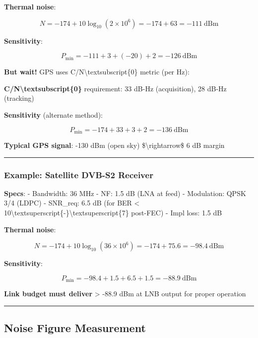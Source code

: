 \textbf{Thermal noise}:

\[
N = -174 + 10\log_{10}(2 \times 10^6) = -174 + 63 = -111\ \text{dBm}
\]

\textbf{Sensitivity}:

\[
P_{\text{min}} = -111 + 3 + (-20) + 2 = -126\ \text{dBm}
\]

\textbf{But wait!} GPS uses C/N\textbackslash textsubscript\{0\} metric
(per Hz):

\textbf{C/N\textbackslash textsubscript\{0\}} requirement: 33 dB-Hz
(acquisition), 28 dB-Hz (tracking)

\textbf{Sensitivity} (alternate method):

\[
P_{\text{min}} = -174 + 33 + 3 + 2 = -136\ \text{dBm}
\]

\textbf{Typical GPS signal}: -130 dBm (open sky)
\$\textbackslash rightarrow\$ 6 dB margin

\begin{center}\rule{0.5\linewidth}{0.5pt}\end{center}

\subsubsection{Example: Satellite DVB-S2
Receiver}\label{example-satellite-dvb-s2-receiver}

\textbf{Specs}: - Bandwidth: 36 MHz - NF: 1.5 dB (LNA at feed) -
Modulation: QPSK 3/4 (LDPC) - SNR\_req: 6.5 dB (for BER \textless{}
10\textbackslash textsuperscript\{-\}\textbackslash textsuperscript\{7\}
post-FEC) - Impl loss: 1.5 dB

\textbf{Thermal noise}:

\[
N = -174 + 10\log_{10}(36 \times 10^6) = -174 + 75.6 = -98.4\ \text{dBm}
\]

\textbf{Sensitivity}:

\[
P_{\text{min}} = -98.4 + 1.5 + 6.5 + 1.5 = -88.9\ \text{dBm}
\]

\textbf{Link budget must deliver} \textgreater{} -88.9 dBm at LNB output
for proper operation

\begin{center}\rule{0.5\linewidth}{0.5pt}\end{center}

\subsection{Noise Figure Measurement}\label{noise-figure-measurement}

